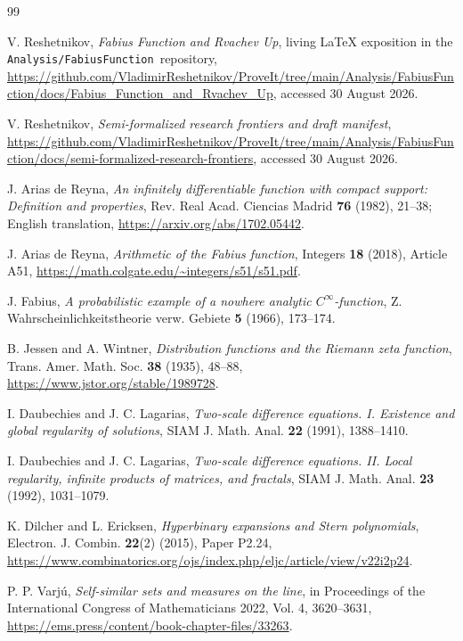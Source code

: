 \documentclass[11pt,oneside]{article}
\theoremstyle{definition}
\theoremstyle{remark}
\newcommand{\repo}{\nolinkurl{Analysis/FabiusFunction}}
\begin{document}
\begin{thebibliography}{99}

V. Reshetnikov,
\emph{Fabius Function and Rvachev Up}, living LaTeX exposition in the \repo\ repository,
\url{https://github.com/VladimirReshetnikov/ProveIt/tree/main/Analysis/FabiusFunction/docs/Fabius_Function_and_Rvachev_Up},
accessed 30 August 2026.

V. Reshetnikov,
\emph{Semi-formalized research frontiers and draft manifest},
\url{https://github.com/VladimirReshetnikov/ProveIt/tree/main/Analysis/FabiusFunction/docs/semi-formalized-research-frontiers},
accessed 30 August 2026.

J. Arias de Reyna,
\emph{An infinitely differentiable function with compact support: Definition and properties},
Rev. Real Acad. Ciencias Madrid \textbf{76} (1982), 21--38; English translation,
\url{https://arxiv.org/abs/1702.05442}.

J. Arias de Reyna,
\emph{Arithmetic of the Fabius function},
Integers \textbf{18} (2018), Article A51,
\url{https://math.colgate.edu/~integers/s51/s51.pdf}.

J. Fabius,
\emph{A probabilistic example of a nowhere analytic $C^\infty$-function},
Z. Wahrscheinlichkeitstheorie verw. Gebiete \textbf{5} (1966), 173--174.

B. Jessen and A. Wintner,
\emph{Distribution functions and the Riemann zeta function},
Trans. Amer. Math. Soc. \textbf{38} (1935), 48--88,
\url{https://www.jstor.org/stable/1989728}.

I. Daubechies and J. C. Lagarias,
\emph{Two-scale difference equations. I. Existence and global regularity of solutions},
SIAM J. Math. Anal. \textbf{22} (1991), 1388--1410.

I. Daubechies and J. C. Lagarias,
\emph{Two-scale difference equations. II. Local regularity, infinite products of matrices,
and fractals},
SIAM J. Math. Anal. \textbf{23} (1992), 1031--1079.

K. Dilcher and L. Ericksen,
\emph{Hyperbinary expansions and Stern polynomials},
Electron. J. Combin. \textbf{22}(2) (2015), Paper P2.24,
\url{https://www.combinatorics.org/ojs/index.php/eljc/article/view/v22i2p24}.

P. P. Varj\'u,
\emph{Self-similar sets and measures on the line},
in Proceedings of the International Congress of Mathematicians 2022, Vol. 4,
3620--3631,
\url{https://ems.press/content/book-chapter-files/33263}.

\end{thebibliography}
\end{document}

